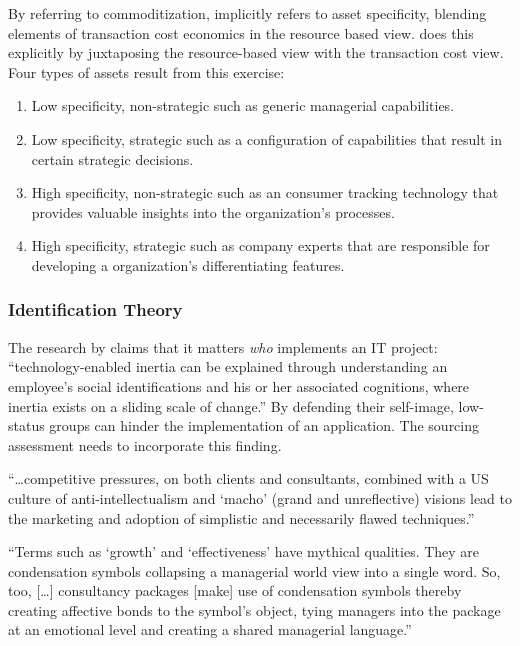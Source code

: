 \documentclass[12pt]{article}
\providecommand{\tightlist}{%
  \setlength{\itemsep}{0pt}\setlength{\parskip}{0pt}}
\begin{document}
By referring to commoditization, \citet{willcocks2003} implicitly refers
to asset specificity, blending elements of transaction cost economics in
the resource based view. \citet{watjatrakul2005} does this explicitly by
juxtaposing the resource-based view with the transaction cost view. Four
types of assets result from this exercise:

\begin{enumerate}
\def\labelenumi{\arabic{enumi}.}
\tightlist
\item
  Low specificity, non-strategic such as generic managerial
  capabilities.
\item
  Low specificity, strategic such as a configuration of capabilities
  that result in certain strategic decisions.
\item
  High specificity, non-strategic such as an consumer tracking
  technology that provides valuable insights into the organization's
  processes.
\item
  High specificity, strategic such as company experts that are
  responsible for developing a organization's differentiating features.
\end{enumerate}

\hypertarget{identification-theory}{%
\subsubsection{Identification Theory}\label{identification-theory}}

The research by \citet[311-313]{schwarz2005} claims that it matters
\emph{who} implements an IT project: ``technology-enabled inertia can be
explained through understanding an employee's social identifications and
his or her associated cognitions, where inertia exists on a sliding
scale of change.'' By defending their self-image, low-status groups can
hinder the implementation of an application. The sourcing assessment
needs to incorporate this finding.

``\ldots competitive pressures, on both clients and consultants,
combined with a US culture of anti-intellectualism and `macho' (grand
and unreflective) visions lead to the marketing and adoption of
simplistic and necessarily flawed techniques.'' \citep[ 34]{sturdy1998}

``Terms such as `growth' and `effectiveness' have mythical qualities.
They are condensation symbols collapsing a managerial world view into a
single word. So, too, {[}\ldots{]} consultancy packages {[}make{]} use
of condensation symbols thereby creating affective bonds to the symbol's
object, tying managers into the package at an emotional level and
creating a shared managerial language.'' \citep[ 290]{gill1993}
\end{document}
